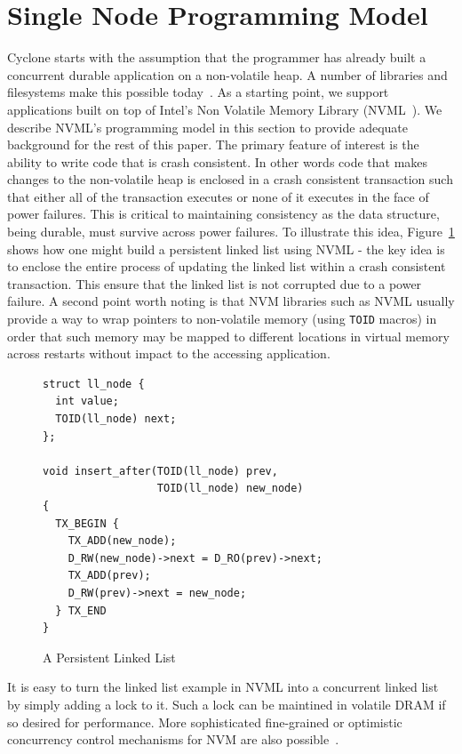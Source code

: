 \documentclass[letterpaper,twocolumn,10pt]{article}
\begin{document}
\section{Single Node Programming Model}
Cyclone starts with the assumption that the programmer has already built a
concurrent durable application on a non-volatile heap. A number of libraries and
filesystems make this possible today~\cite{nvml, dax}. As a starting point, we
support applications built on top of Intel's Non Volatile Memory Library
(NVML~\cite{nvml}). We describe NVML's programming model in this section to
provide adequate background for the rest of this paper. The primary feature of
interest is the ability to write code that is crash consistent. In other words
code that makes changes to the non-volatile heap is enclosed in a crash
consistent transaction such that either all of the transaction executes or none
of it executes in the face of power failures. This is critical to maintaining
consistency as the data structure, being durable, must survive across power
failures. To illustrate this idea, Figure~\ref{fig:example} shows how one might
build a persistent linked list using NVML - the key idea is to enclose the
entire process of updating the linked list within a crash consistent
transaction. This ensure that the linked list is not corrupted due to a power
failure. A second point worth noting is that NVM libraries such as NVML usually
provide a way to wrap pointers to non-volatile memory (using {\tt TOID} macros)
in order that such memory may be mapped to different locations in virtual memory
across restarts without impact to the accessing application.

\begin{figure}
  { \scriptsize
\begin{verbatim}
struct ll_node {
  int value;
  TOID(ll_node) next;
};

void insert_after(TOID(ll_node) prev, 
                  TOID(ll_node) new_node)
{
  TX_BEGIN {
    TX_ADD(new_node);
    D_RW(new_node)->next = D_RO(prev)->next;
    TX_ADD(prev);
    D_RW(prev)->next = new_node;
  } TX_END
}

\end{verbatim}
  }
\caption{A Persistent Linked List}
\label{fig:example}
\end{figure}

It is easy to turn the linked list example in NVML into a concurrent linked list
by simply adding a lock to it. Such a lock can be maintined in volatile DRAM if
so desired for performance. More sophisticated fine-grained or optimistic
concurrency control mechanisms for NVM are also possible~\cite{mnemosyne}.
\end{document}
